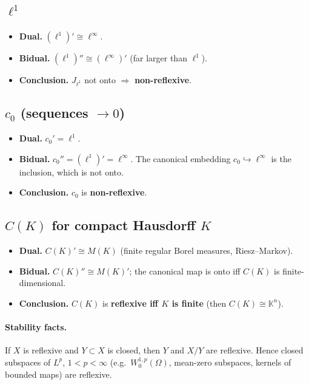 \documentclass[12pt,a4paper]{article}
\theoremstyle{plain}
\theoremstyle{definition}
\theoremstyle{remark}
\theoremstyle{remark}
\theoremstyle{definition}
\begin{document}
\subsection*{$\ell^1$}
\begin{itemize}
	\item \textbf{Dual.} $(\ell^1)'\cong \ell^\infty$.
	\item \textbf{Bidual.} $(\ell^1)''\cong (\ell^\infty)'$ (far larger than $\ell^1$).
	\item \textbf{Conclusion.} $J_{\ell^1}$ not onto $\Rightarrow$ \textbf{non-reflexive}.
\end{itemize}

\subsection*{$c_0$ (sequences $\to0$)}
\begin{itemize}
	\item \textbf{Dual.} $c_0'=\ell^1$.
	\item \textbf{Bidual.} $c_0''=(\ell^1)'=\ell^\infty$. The canonical embedding $c_0\hookrightarrow\ell^\infty$ is the inclusion, which is not onto.
	\item \textbf{Conclusion.} $c_0$ is \textbf{non-reflexive}.
\end{itemize}

\subsection*{$C(K)$ for compact Hausdorff $K$}
\begin{itemize}
	\item \textbf{Dual.} $C(K)'\cong M(K)$ (finite regular Borel measures, Riesz--Markov).
	\item \textbf{Bidual.} $C(K)''\cong M(K)'$; the canonical map is onto iff $C(K)$ is finite-dimensional.
	\item \textbf{Conclusion.} $C(K)$ is \textbf{reflexive iff $K$ is finite} (then $C(K)\cong \mathbb{K}^n$).
\end{itemize}

\paragraph{Stability facts.}
If $X$ is reflexive and $Y\subset X$ is closed, then $Y$ and $X/Y$ are reflexive. Hence closed subspaces of $L^p$, $1<p<\infty$ (e.g.\ $W^{1,p}_0(\Omega)$, mean-zero subspaces, kernels of bounded maps) are reflexive.
\end{document}
